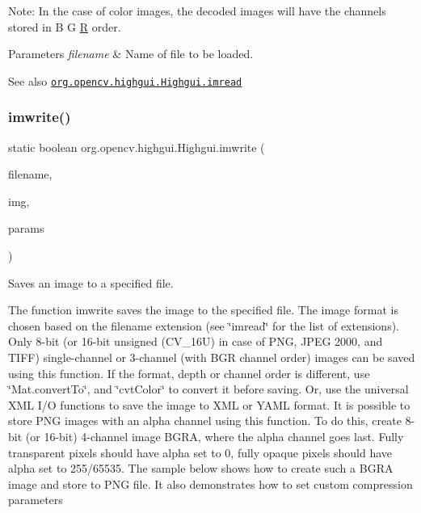 Note\+: In the case of color images, the decoded images will have the channels stored in {\ttfamily B G \mbox{\hyperlink{classorg_1_1opencv_1_1_r}{R}}} order.


\begin{DoxyParams}{Parameters}
{\em filename} & Name of file to be loaded.\\
\hline
\end{DoxyParams}
\begin{DoxySeeAlso}{See also}
\href{http://docs.opencv.org/modules/highgui/doc/reading_and_writing_images_and_video.html#imread}{\tt org.\+opencv.\+highgui.\+Highgui.\+imread} 
\end{DoxySeeAlso}
\mbox{\label{classorg_1_1opencv_1_1highgui_1_1_highgui_a096ee9b12d8d232cf9b93b69f765c0be}} 
\subsubsection{\texorpdfstring{imwrite()}{imwrite()}\hspace{0.1cm}{\footnotesize\ttfamily [1/2]}}
{\footnotesize\ttfamily static boolean org.\+opencv.\+highgui.\+Highgui.\+imwrite (\begin{DoxyParamCaption}\item[{String}]{filename,  }\item[{\mbox{\hyperlink{classorg_1_1opencv_1_1core_1_1_mat}{Mat}}}]{img,  }\item[{\mbox{\hyperlink{classorg_1_1opencv_1_1core_1_1_mat_of_int}{Mat\+Of\+Int}}}]{params }\end{DoxyParamCaption})\hspace{0.3cm}{\ttfamily [static]}}

Saves an image to a specified file.

The function {\ttfamily imwrite} saves the image to the specified file. The image format is chosen based on the {\ttfamily filename} extension (see \char`\"{}imread\char`\"{} for the list of extensions). Only 8-\/bit (or 16-\/bit unsigned ({\ttfamily C\+V\+\_\+16U}) in case of P\+NG, J\+P\+EG 2000, and T\+I\+FF) single-\/channel or 3-\/channel (with \textquotesingle{}B\+GR\textquotesingle{} channel order) images can be saved using this function. If the format, depth or channel order is different, use \char`\"{}\+Mat.\+convert\+To\char`\"{}, and \char`\"{}cvt\+Color\char`\"{} to convert it before saving. Or, use the universal X\+ML I/O functions to save the image to X\+ML or Y\+A\+ML format. It is possible to store P\+NG images with an alpha channel using this function. To do this, create 8-\/bit (or 16-\/bit) 4-\/channel image B\+G\+RA, where the alpha channel goes last. Fully transparent pixels should have alpha set to 0, fully opaque pixels should have alpha set to 255/65535. The sample below shows how to create such a B\+G\+RA image and store to P\+NG file. It also demonstrates how to set custom compression parameters {\ttfamily }

